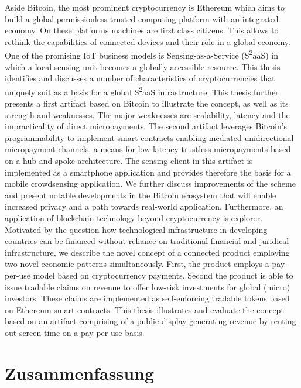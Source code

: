 Aside Bitcoin, the most prominent cryptocurrency is Ethereum which aims to build a global permissionless trusted computing platform with an integrated economy. On these platforms machines are first class citizens. This allows to rethink the capabilities of connected devices and their role in a global economy.
One of the promising IoT business models is Sensing-as-a-Service (S\textsuperscript{2}aaS) in which a local sensing unit becomes a globally accessible resource.  This thesis identifies and discusses a number of characteristics of cryptocurrencies that uniquely suit as a basis for a global S\textsuperscript{2}aaS infrastructure. This thesis further presents a first artifact based on Bitcoin to illustrate the concept, as well as its strength and weaknesses. The major weaknesses are scalability, latency and the impracticality of direct micropayments. The second artifact leverages Bitcoin’s programmability to implement smart contracts enabling mediated unidirectional micropayment channels, a means for low-latency trustless micropayments based on a hub and spoke architecture. The sensing client in this artifact is implemented as a smartphone application and provides therefore the basis for a mobile crowdsensing application. We further discuss improvements of the scheme and present notable developments in the Bitcoin ecosystem that will enable increased privacy and a path towards real-world application.
Furthermore, an application of blockchain technology beyond cryptocurrency is explorer. Motivated by the question how technological infrastructure in developing countries can be financed without reliance on traditional financial and juridical infrastructure, we describe the novel concept of a connected product employing two novel economic patterns simultaneously. First, the product employs a pay-per-use model based on cryptocurrency payments. Second the product is able to issue tradable claims on revenue to offer low-risk investments for global (micro) investors. These claims are implemented as self-enforcing tradable tokens based on Ethereum smart contracts. This thesis illustrates and evaluate the concept based on an artifact comprising of a public display generating revenue by renting out screen time on a pay-per-use basis.



%
\vfill

\pagebreak


\chapter*{Zusammenfassung}




\endgroup

\vfill
